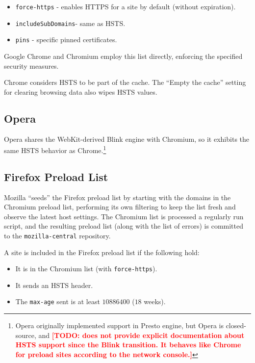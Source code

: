 \documentclass[conference]{./IEEEtran}
\newcommand{\todo}[1]{\textcolor{red}{\textbf{[TODO: #1]}}}
\newcommand{\code}[1]{\texttt{#1}}
\newcommand{\iSD}{{\code{includeSubDomains}}}
\theoremstyle{plain}
\begin{document}
\begin{itemize}
\item \code{force-https} - enables HTTPS for a site by default (without expiration).
\item \iSD - same as HSTS.
\item \code{pins} - specific pinned certificates.
\end{itemize}

Google Chrome and Chromium employ this list directly, enforcing the specified security measures.

Chrome considers HSTS to be part of the cache. The ``Empty the cache'' setting for clearing browsing data also wipes HSTS values.

\subsection{Opera}

Opera shares the WebKit-derived Blink engine with Chromium, so it exhibits the same HSTS behavior as Chrome.\footnote{Opera originally implemented support in Presto engine\cite{opera}, but Opera is closed-source, and \todo{does not provide explicit documentation about HSTS support since the Blink transition. It behaves like Chrome for preload sites according to the network console.}}

\subsection{Firefox Preload List}

Mozilla ``seeds'' the Firefox preload list by starting with the domains in the Chromium preload list, performing its own filtering to keep the list fresh and observe the latest host settings. The Chromium list is processed a regularly run\cite{firefox-cron}\cite{firefox-cron-script} script\cite{firefox-script}, and the resulting preload list\cite{firefox-list} (along with the list of errors\cite{firefox-errors}) is committed to the \code{mozilla-central} repository.

A site is included in the Firefox preload list if the following hold:

\begin{itemize}
\item It is in the Chromium list (with \code{force-https}).
\item It sends an HSTS header.
\item The \code{max-age} sent is at least $10886400$ ($18$ weeks).
\end{itemize}
\end{document}
